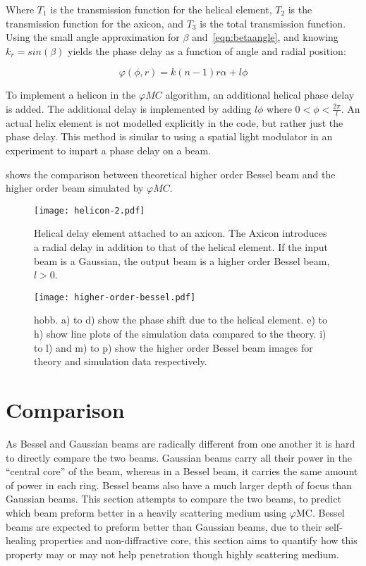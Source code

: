 Where $T_1$ is the transmission function for the helical element, $T_2$ is the transmission function for the axicon, and $T_3$ is the total transmission function.
Using the small angle approximation  for $\beta$ and~\cref{eqn:betaangle}, and knowing $k_r=sin\left(\beta\right)$ yields the phase delay as a function of angle and radial position:

\begin{equation}
\varphi(\phi,r)=k(n-1)r\alpha+l\phi
\end{equation}

To implement a helicon in the $\varphi MC$ algorithm, an additional helical phase delay is added.
The additional delay is implemented by adding $l\phi$ where $0<\phi<\tfrac{2\pi}{l}$.
An actual helix element is not modelled explicitly in the code, but rather just the phase delay.
This method is similar to using a spatial light modulator in an experiment to impart a phase delay on a beam.

 shows the comparison between theoretical higher order Bessel beam and the higher order beam simulated by $\varphi MC$.

\begin{figure}[!ht]
    \centering
    \texttt{[image: helicon-2.pdf]}
    \caption{Helical delay element attached to an axicon. The Axicon introduces a radial delay in addition to that of the helical element. If the input beam is a Gaussian, the output beam is a higher order Bessel beam, $l>0$.}
    \label{fig:helix-2}
    \vspace{-10pt}
\end{figure}

\begin{figure}[!ht]
    \centering
    \texttt{[image: higher-order-bessel.pdf]}
    \caption{\Gls*{hobb}. a) to d) show the phase shift due to the helical element. e) to h) show line plots of the simulation data compared to the theory. i) to l) and m) to p) show the higher order Bessel beam images for theory and simulation data respectively.}
    \label{fig:highordershow}
\end{figure}

\FloatBarrier
\section{Comparison}
\label{sec:compBeams}
As Bessel and Gaussian beams are radically different from one another it is hard to directly compare the two beams.
Gaussian beams carry all their power in the ``central core'' of the beam, whereas in a Bessel beam, it carries the same amount of power in each ring.
Bessel beams also have a much larger depth of focus than Gaussian beams.
This section attempts to compare the two beams, to predict which beam preform better in a heavily scattering medium using $\varphi$MC\@.
Bessel beams are expected to preform better than Gaussian beams, due to their self-healing properties and non-diffractive core, this section aims to quantify how this property may or may not help penetration though highly scattering medium. 


